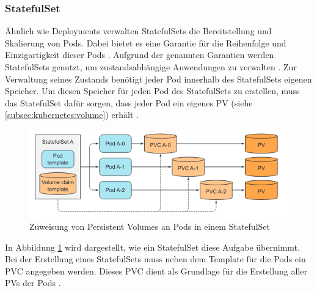\subsubsection{StatefulSet}
\label{subsec:kubernetes:statefulset}
Ähnlich wie Deployments verwalten StatefulSets die Bereitstellung und Skalierung von Pods.
Dabei bietet es eine Garantie für die Reihenfolge und Einzigartigkeit dieser Pods \cite{kubernetesStatefulSets}.
Aufgrund der genannten Garantien werden StatefulSets genutzt, um zustandsabhängige Anwendungen zu verwalten \cite{kubernetesStatefulSets}.
Zur Verwaltung seines Zustands benötigt jeder Pod innerhalb des StatefulSets eigenen Speicher.
Um diesen Speicher für jeden Pod des StatefulSets zu erstellen, muss das StatefulSet dafür sorgen, 
dass jeder Pod ein eigenes \ac{PV} (siehe \ref{subsec:kubernetes:volume}) erhält \cite{Marko2018}.
\begin{figure}[h]
  \centering
  \includegraphics[width=\textwidth]{gfx/chapters/2_grundlagen/statefulsets.png}
  \caption{Zuweisung von Persistent Volumes an Pods in einem StatefulSet}
  \label{fig:kubernetes:statefulsets}
\end{figure}


In Abbildung \ref{fig:kubernetes:statefulsets} wird dargestellt, wie ein StatefulSet diese Aufgabe übernimmt.
Bei der Erstellung eines StatefulSets muss neben dem Template für die Pods ein \ac{PVC} angegeben werden. 
Dieses \ac{PVC} dient als Grundlage für die Erstellung aller \acp{PV} der Pods \cite{Marko2018}.
